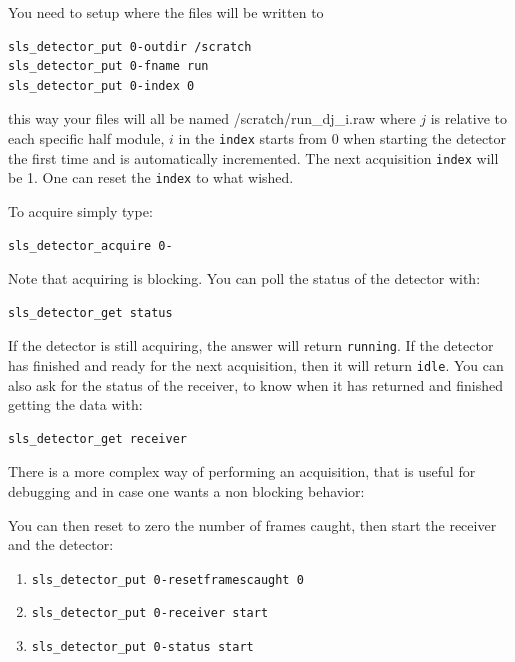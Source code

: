 \documentclass{article}
\begin{document}

You need to setup where the files will be written to
\begin{verbatim}
sls_detector_put 0-outdir /scratch
sls_detector_put 0-fname run
sls_detector_put 0-index 0
\end{verbatim}
this way your files will all be named /scratch/run\_dj\_i.raw where $j$ is relative to each specific half module, $i$ in the {\tt{index}} starts from 0 when starting the detector the first time and is automatically incremented. The next acquisition {\tt{index}} will be 1. One can reset the  {\tt{index}} to what wished.

To acquire simply type:
\begin{verbatim}
sls_detector_acquire 0-
\end{verbatim}
Note that acquiring is blocking.
You can poll the status of the detector with:
\begin{verbatim}
sls_detector_get status
\end{verbatim}
If the detector is still acquiring, the answer will return {\tt{running}}. If the detector has finished and ready for the next acquisition, then it will return {\tt{idle}}.
You can also ask for the status of the receiver, to know when it has returned and finished getting the data with:
\begin{verbatim}
sls_detector_get receiver
\end{verbatim}

There is a more complex way of performing an acquisition, that is useful for debugging and in case one wants a non blocking behavior: 

You can then reset to zero the number of frames caught, then  start the receiver and the detector:
\begin{enumerate}
\item {\tt{sls\_detector\_put 0-resetframescaught 0}} 
\item {\tt{sls\_detector\_put 0-receiver start}} 
\item {\tt{sls\_detector\_put 0-status start}} 
\end{enumerate}
\end{document}
